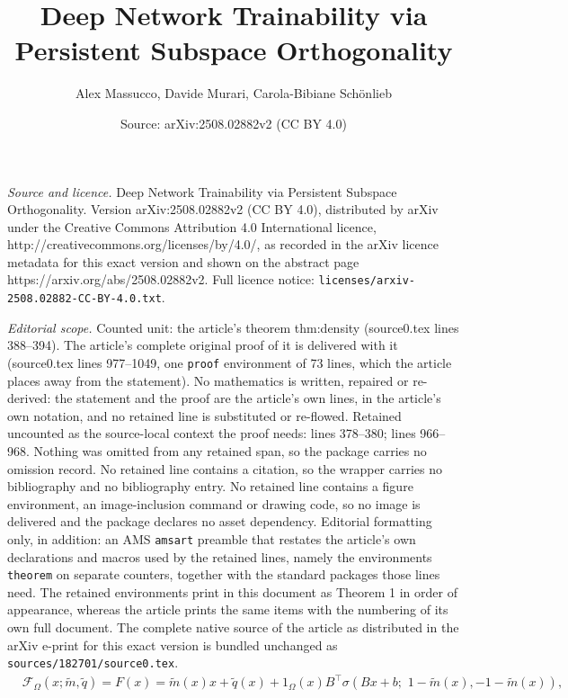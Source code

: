 \documentclass[10pt,a4paper]{amsart}
\title{Deep Network Trainability via Persistent Subspace Orthogonality}
\author{Alex Massucco, Davide Murari, Carola-Bibiane Sch\"onlieb}
\date{Source: arXiv:2508.02882v2 (CC BY 4.0)}
\begin{document}
\maketitle

\noindent\emph{Source and licence.} Deep Network Trainability via Persistent Subspace Orthogonality. Version arXiv:2508.02882v2 (CC BY 4.0), distributed by arXiv under the Creative Commons Attribution 4.0 International licence, http://creativecommons.org/licenses/by/4.0/, as recorded in the arXiv licence metadata for this exact version and shown on the abstract page https://arxiv.org/abs/2508.02882v2. Full licence notice: \texttt{licenses/arxiv-2508.02882-CC-BY-4.0.txt}.\par\smallskip

\noindent\textit{Editorial scope.} Counted unit: the article's theorem thm:density (source0.tex lines 388--394). The article's complete original proof of it is delivered with it (source0.tex lines 977--1049, one \texttt{proof} environment of 73 lines, which the article places away from the statement). No mathematics is written, repaired or re-derived: the statement and the proof are the article's own lines, in the article's own notation, and no retained line is substituted or re-flowed.  Retained uncounted as the source-local context the proof needs: lines 378--380; lines 966--968.  Nothing was omitted from any retained span, so the package carries no omission record.  No retained line contains a citation, so the wrapper carries no bibliography and no bibliography entry.  No retained line contains a figure environment, an image-inclusion command or drawing code, so no image is delivered and the package declares no asset dependency.  Editorial formatting only, in addition: an AMS \texttt{amsart} preamble that restates the article's own declarations and macros used by the retained lines, namely the environments \texttt{theorem} on separate counters, together with the standard packages those lines need.  The retained environments print in this document as Theorem 1 in order of appearance, whereas the article prints the same items with the numbering of its own full document.  The complete native source of the article as distributed in the arXiv e-print for this exact version is bundled unchanged as \texttt{sources/182701/source0.tex}.
\begin{align}
&\mathcal{F}_\Omega(x; \widetilde{m}, \widetilde{q})=F(x) = \widetilde{m}(x)x + \widetilde{q}(x) + 1_{\Omega}(x)B^\top \sigma(Bx+b;\,\,1-\widetilde{m}(x),-1-\widetilde{m}(x)),\label{eq:pwcontinuous}
\end{align}
\end{document}
